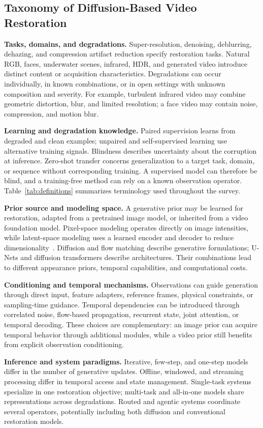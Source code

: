 \subsection{Taxonomy of Diffusion-Based Video Restoration}
\textbf{Tasks, domains, and degradations.} Super-resolution, denoising, deblurring, dehazing, and compression artifact reduction specify restoration tasks. Natural RGB, faces, underwater scenes, infrared, HDR, and generated video introduce distinct content or acquisition characteristics. Degradations can occur individually, in known combinations, or in open settings with unknown composition and severity. For example, turbulent infrared video may combine geometric distortion, blur, and limited resolution; a face video may contain noise, compression, and motion blur.

\textbf{Learning and degradation knowledge.} Paired supervision learns from degraded and clean examples; unpaired and self-supervised learning use alternative training signals. Blindness describes uncertainty about the corruption at inference. Zero-shot transfer concerns generalization to a target task, domain, or sequence without corresponding training. A supervised model can therefore be blind, and a training-free method can rely on a known observation operator. Table~\ref{tab:definitions} summarizes terminology used throughout the survey.

\textbf{Prior source and modeling space.} A generative prior may be learned for restoration, adapted from a pretrained image model, or inherited from a video foundation model. Pixel-space modeling operates directly on image intensities, while latent-space modeling uses a learned encoder and decoder to reduce dimensionality~\cite{ldm}. Diffusion and flow matching describe generative formulations; U-Nets and diffusion transformers describe architectures. Their combinations lead to different appearance priors, temporal capabilities, and computational costs.

\textbf{Conditioning and temporal mechanisms.} Observations can guide generation through direct input, feature adapters, reference frames, physical constraints, or sampling-time guidance. Temporal dependencies can be introduced through correlated noise, flow-based propagation, recurrent state, joint attention, or temporal decoding. These choices are complementary: an image prior can acquire temporal behavior through additional modules, while a video prior still benefits from explicit observation conditioning.

\textbf{Inference and system paradigms.} Iterative, few-step, and one-step models differ in the number of generative updates. Offline, windowed, and streaming processing differ in temporal access and state management. Single-task systems specialize in one restoration objective; multi-task and all-in-one models share representations across degradations. Routed and agentic systems coordinate several operators, potentially including both diffusion and conventional restoration models.


